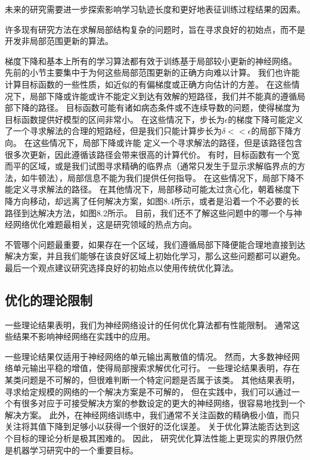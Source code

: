 
未来的研究需要进一步探索影响学习轨迹长度和更好地表征训练过程结果的因素。

许多现有研究方法在求解局部结构复杂的问题时，旨在寻求良好的初始点，而不是开发非局部范围更新的算法。

梯度下降和基本上所有的学习算法都有效于训练基于局部较小更新的神经网络。
先前的小节主要集中于为何这些局部范围更新的正确方向难以计算。
我们也许能计算目标函数的一些性质，如近似的有偏梯度或正确方向估计的方差。
在这些情况下，局部下降或许能或许不能定义到达有效解的短路径，我们并不能真的遵循局部下降的路径。
目标函数可能有诸如病态条件或不连续导数的问题，使得梯度为目标函数提供好模型的区间非常小。
在这些情况下，步长为$\epsilon$的梯度下降可能定义了一个寻求解法的合理的短路经，但是我们只能计算步长为$\delta << \epsilon$的局部下降方向。
在这些情况下，局部下降或许能 定义一个寻求解法的路径，但是该路径包含很多次更新，因此遵循该路径会带来很高的计算代价。
有时，目标函数有一个宽而平的区域，或是我们试图寻求精确的临界点（通常只发生于显示求解临界点的方法，如牛顿法），局部信息不能为我们提供任何指导。
在这些情况下，局部下降不能定义寻求解法的路径。
在其他情况下，局部移动可能太过贪心化，朝着梯度下降方向移动，却远离了任何解决方案，如图8.4所示，或者是沿着一个不必要的长路径到达解决方法，如图8.2所示。
目前，我们还不了解这些问题中的哪一个与神经网络优化难题最相关，这是研究领域的热点方向。


不管哪个问题最重要，如果存在一个区域，我们遵循局部下降便能合理地直接到达解决方案，并且我们能够在该良好区域上初始化学习，那么这些问题都可以避免。
最后一个观点建议研究选择良好的初始点以使用传统优化算法。

\subsection{优化的理论限制}
\label{sec:theoretical_limits_of_optimization}
一些理论结果表明，我们为神经网络设计的任何优化算法都有性能限制\citep{Blum92,JuddBook,wolpert96no}。
通常这些结果不影响神经网络在实践中的应用。

一些理论结果仅适用于神经网络的单元输出离散值的情况。
然而，大多数神经网络单元输出平稳的增值，使得局部搜索求解优化可行。
一些理论结果表明，存在某类问题是不可解的，但很难判断一个特定问题是否属于该类。
其他结果表明，寻求给定规模的网络的一个解决方案是不可解的，
但在实践中，我们可以通过一个有很多对应于可接受解决方案的参数设定的更大的神经网络，很容易地找到一个解决方案。
此外，在神经网络训练中，我们通常不关注函数的精确极小值，而只关注将其值下降到足够小以获得一个很好的泛化误差。
关于优化算法能否达到这个目标的理论分析是极其困难的。
因此， 研究优化算法性能上更现实的界限仍然是机器学习研究中的一个重要目标。

